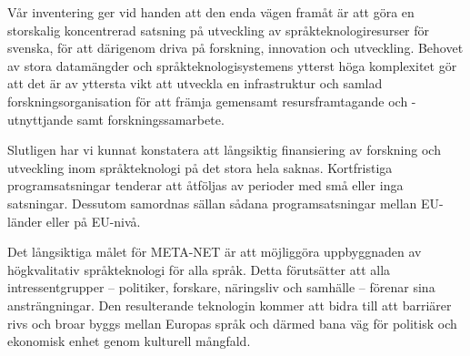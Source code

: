\begin{multicols}{2}
Vår inventering ger vid handen att den enda vägen framåt är att göra
en storskalig koncentrerad satsning på utveckling av
språkteknologiresurser för svenska, för att därigenom driva på
forskning, innovation och utveckling. Behovet av stora datamängder och
språkteknologisystemens ytterst höga komplexitet gör att det är av
yttersta vikt att utveckla en infrastruktur och samlad
forskningsorganisation för att främja gemensamt resursframtagande och
\mbox{-utnyttjande} samt forskningssamarbete.

Slutligen har vi kunnat konstatera att långsiktig finansiering av
forskning och utveckling inom språkteknologi på det stora hela
saknas. Kortfristiga programsatsningar tenderar att åtföljas av
perioder med små eller inga satsningar. Dessutom samordnas sällan
sådana programsatsningar mellan EU-länder eller på EU-nivå.

Det långsiktiga målet för META-NET är att möjliggöra uppbyggnaden av
högkvalitativ språkteknologi för alla språk. Detta förutsätter att
alla intressentgrupper -- politiker, forskare, näringsliv och
samhälle -- förenar sina ansträngningar. Den resulterande teknologin
kommer att bidra till att barriärer rivs och broar byggs mellan
Europas språk och därmed bana väg för politisk och ekonomisk enhet
genom kulturell mångfald.
\end{multicols}

\clearpage

